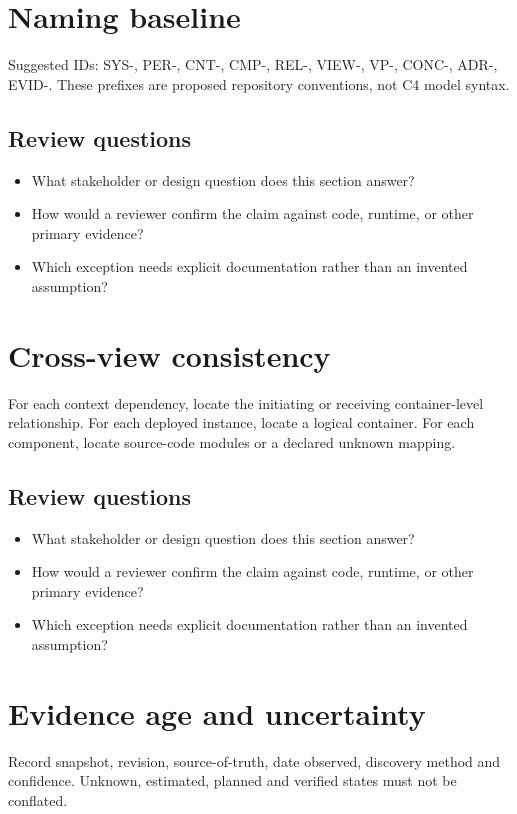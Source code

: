 \documentclass[10pt,letterpaper]{article}
\begin{document}
\section{Naming baseline}
Suggested IDs: SYS-, PER-, CNT-, CMP-, REL-, VIEW-, VP-, CONC-, ADR-, EVID-. These prefixes are proposed repository conventions, not C4 model syntax.


\subsection{Review questions}
\begin{itemize}
\item What stakeholder or design question does this section answer?
\item How would a reviewer confirm the claim against code, runtime, or other primary evidence?
\item Which exception needs explicit documentation rather than an invented assumption?
\end{itemize}

\section{Cross-view consistency}
For each context dependency, locate the initiating or receiving container-level relationship. For each deployed instance, locate a logical container. For each component, locate source-code modules or a declared unknown mapping.


\subsection{Review questions}
\begin{itemize}
\item What stakeholder or design question does this section answer?
\item How would a reviewer confirm the claim against code, runtime, or other primary evidence?
\item Which exception needs explicit documentation rather than an invented assumption?
\end{itemize}

\section{Evidence age and uncertainty}
Record snapshot, revision, source-of-truth, date observed, discovery method and confidence. Unknown, estimated, planned and verified states must not be conflated.
\end{document}
